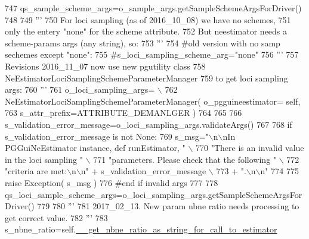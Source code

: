 \begin{DoxyCode}
747         qs\_sample\_scheme\_args=o\_sample\_args.getSampleSchemeArgsForDriver()
748 
749         \textcolor{stringliteral}{'''}
750 \textcolor{stringliteral}{        For loci sampling (as of 2016\_10\_08) we have no schemes,}
751 \textcolor{stringliteral}{        only the entery "none" for the scheme attribute.}
752 \textcolor{stringliteral}{        But neestimator needs a scheme-params args (any string), so:}
753 \textcolor{stringliteral}{        '''}
754         \textcolor{comment}{#old version with no samp sechemes except "none":}
755         \textcolor{comment}{#s\_loci\_sampling\_scheme\_arg="none"}
756         \textcolor{stringliteral}{'''}
757 \textcolor{stringliteral}{        Revisions 2016\_11\_07 now use new pgutility class }
758 \textcolor{stringliteral}{        NeEstimatorLociSamplingSchemeParameterManager}
759 \textcolor{stringliteral}{        to get loci sampling args:}
760 \textcolor{stringliteral}{        '''}
761         o\_loci\_sampling\_args= \(\backslash\)
762                 NeEstimatorLociSamplingSchemeParameterManager( o\_pgguineestimator= self,
763                                                                 s\_attr\_prefix=ATTRIBUTE\_DEMANLGER )
764 
765         
766         s\_validation\_error\_message=o\_loci\_sampling\_args.validateArgs()
767 
768         \textcolor{keywordflow}{if} s\_validation\_error\_message \textcolor{keywordflow}{is} \textcolor{keywordflow}{not} \textcolor{keywordtype}{None}:
769             s\_msg=\textcolor{stringliteral}{"\(\backslash\)n\(\backslash\)nIn PGGuiNeEstimator instance, def runEstimator, "} \(\backslash\)
770                     \textcolor{stringliteral}{"There is an invalid value in the loci sampling "} \(\backslash\)
771                     \textcolor{stringliteral}{"parameters.  Please check that the following "} \(\backslash\)
772                     \textcolor{stringliteral}{"criteria are met:\(\backslash\)n\(\backslash\)n"} + s\_validation\_error\_message \(\backslash\)
773                     + \textcolor{stringliteral}{".\(\backslash\)n\(\backslash\)n"}
774         
775             \textcolor{keywordflow}{raise} Exception( s\_msg )
776         \textcolor{comment}{#end if invalid args}
777 
778         qs\_loci\_sample\_scheme\_args=o\_loci\_sampling\_args.getSampleSchemeArgsForDriver()
779 
780         \textcolor{stringliteral}{'''}
781 \textcolor{stringliteral}{        2017\_02\_13. New param nbne ratio needs processing to get correct value.}
782 \textcolor{stringliteral}{        '''}
783         s\_nbne\_ratio=self.\hyperlink{classnegui_1_1pgguineestimator__experimental_1_1PGGuiNeEstimator_a272f92766556a42980a831e7fe84244c}{\_\_get\_nbne\_ratio\_as\_string\_for\_call\_to\_estimator}

\end{DoxyCode}
